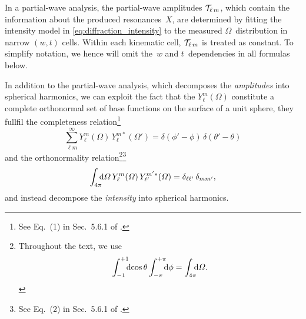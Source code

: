In a partial-wave analysis, the partial-wave amplitudes
$\mathcal{T}_{\ell\, m}$, which contain the information about the
produced resonances~$X$, are determined by fitting the intensity model
in \cref{eq:diffraction_intensity} to the measured
$\Omega$~distribution in narrow $(w, t)$ cells.  Within each kinematic
cell, $\mathcal{T}_{\ell\, m}$ is treated as constant.  To simplify
notation, we hence will omit the~$w$ and $t$~dependencies in all
formulas below.

In addition to the partial-wave analysis, which decomposes the
\emph{amplitudes} into spherical harmonics, we can exploit the fact
that the $Y_\ell^m(\Omega)$ constitute a complete orthonormal set of
base functions on the surface of a unit sphere, \ie they fullfil the
completeness relation\footnote{See Eq.~(1) in Sec.~5.6.1 of
.}
\begin{equation}
  \label{eq:spherical_harm_complete}
  \sum_{\ell m}^\infty Y_\ell^m(\Omega)\, Y_\ell^{m *}(\Omega')
  = \delta(\phi' - \phi)\, \delta(\theta' - \theta)
\end{equation}
and the orthonormality relation\footnote{%
Throughout the text, we use
\begin{equation}
  \int_{-1}^{+1}\!\!\! \dif{\cos\theta} \int_{-\pi}^{+\pi}\!\!\! \dif{\phi}
  = \int_{4 \pi}\!\!\! \dif{\Omega}.
\end{equation}
}\footnote{See Eq.~(2) in Sec.~5.6.1 of
.}
\begin{equation}
  \label{eq:spherical_harm_orthonorm}
  \int_{4 \pi}\!\!\! \dif{\Omega}\, Y_\ell^m(\Omega)\, Y_{\ell'}^{m' *}(\Omega)
  = \delta_{\ell \ell'}\, \delta_{m m'},
\end{equation}
and instead decompose the \emph{intensity} into spherical harmonics.


